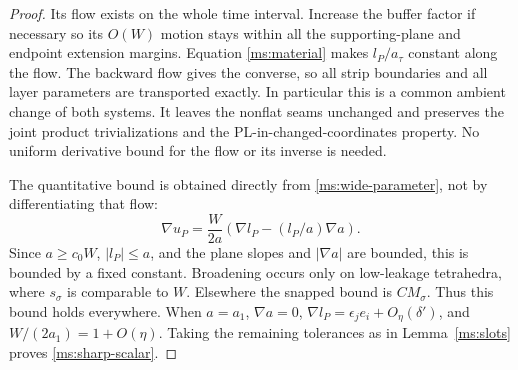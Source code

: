 \documentclass[11pt]{article}
\numberwithin{equation}{section}
\theoremstyle{definition}
\theoremstyle{remark}
\begin{document}
\begin{proof}
Its flow exists on the whole time interval.  Increase the buffer
factor if necessary so its $O(W)$ motion stays within all the
supporting-plane and endpoint extension margins.  Equation
\eqref{ms:material} makes $l_P/a_\tau$ constant along the flow.
The backward flow gives the converse, so all strip boundaries and
all layer parameters are transported exactly.  In particular this
is a common ambient change of both systems.  It leaves the
nonflat seams unchanged and preserves the joint product
trivializations and the PL-in-changed-coordinates property.
No uniform derivative bound for the flow or its inverse is needed.

The quantitative bound is obtained directly from
\eqref{ms:wide-parameter}, not by differentiating that flow:
\[
 \nabla u_P
   =\frac W{2a}\left(\nabla l_P-(l_P/a)\nabla a\right).
\]
Since $a\ge c_0W$, $|l_P|\le a$, and the plane slopes and
$|\nabla a|$ are bounded, this is bounded by a fixed constant.
Broadening occurs only on low-leakage tetrahedra, where
$s_\sigma$ is comparable to $W$.  Elsewhere the snapped bound is
$CM_\sigma$.  Thus this bound holds everywhere.  When $a=a_1$,
$\nabla a=0$, $\nabla l_P=\epsilon_je_i+O_\eta(\delta')$, and
$W/(2a_1)=1+O(\eta)$.  Taking the remaining tolerances as in
Lemma~\ref{ms:slots} proves \eqref{ms:sharp-scalar}.
\end{proof}
\end{document}
